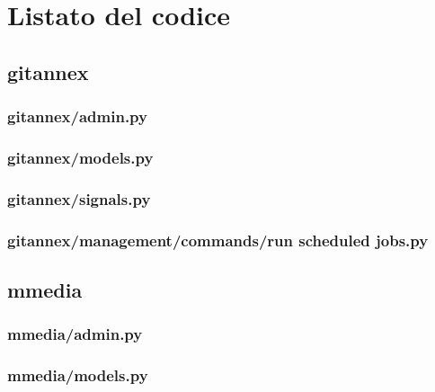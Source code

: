 \chapter{Listato del codice}
\label{AppendiceA}

\section{gitannex}

\subsection{gitannex/admin.py}


\subsection{gitannex/models.py}


\subsection{gitannex/signals.py}


\subsection{gitannex/management/commands/run scheduled jobs.py}



\section{mmedia}

\subsection{mmedia/admin.py}


\subsection{mmedia/models.py}


